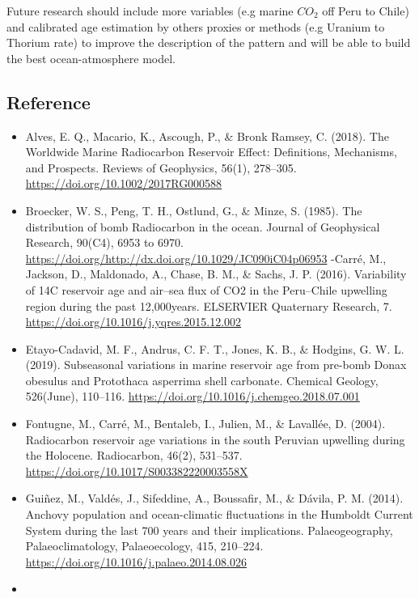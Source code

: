 \documentclass[
]{article}
\providecommand{\tightlist}{%
  \setlength{\itemsep}{0pt}\setlength{\parskip}{0pt}}
\begin{document}
Future research should include more variables (e.g marine \(CO_2\) off
Peru to Chile) and calibrated age estimation by others proxies or
methods (e.g Uranium to Thorium rate) to improve the description of the
pattern and will be able to build the best ocean-atmosphere model.

\hypertarget{reference}{%
\subsection{Reference}\label{reference}}

\begin{itemize}
\tightlist
\item
  Alves, E. Q., Macario, K., Ascough, P., \& Bronk Ramsey, C. (2018).
  The Worldwide Marine Radiocarbon Reservoir Effect: Definitions,
  Mechanisms, and Prospects. Reviews of Geophysics, 56(1), 278--305.
  \url{https://doi.org/10.1002/2017RG000588}
\item
  Broecker, W. S., Peng, T. H., Ostlund, G., \& Minze, S. (1985). The
  distribution of bomb Radiocarbon in the ocean. Journal of Geophysical
  Research, 90(C4), 6953 to 6970.
  \url{https://doi.org/http://dx.doi.org/10.1029/JC090iC04p06953}
  -Carré, M., Jackson, D., Maldonado, A., Chase, B. M., \& Sachs, J. P.
  (2016). Variability of 14C reservoir age and air--sea flux of CO2 in
  the Peru--Chile upwelling region during the past 12,000years.
  ELSERVIER Quaternary Research, 7.
  \url{https://doi.org/10.1016/j.yqres.2015.12.002}
\item
  Etayo-Cadavid, M. F., Andrus, C. F. T., Jones, K. B., \& Hodgins, G.
  W. L. (2019). Subseasonal variations in marine reservoir age from
  pre-bomb Donax obesulus and Protothaca asperrima shell carbonate.
  Chemical Geology, 526(June), 110--116.
  \url{https://doi.org/10.1016/j.chemgeo.2018.07.001}
\item
  Fontugne, M., Carré, M., Bentaleb, I., Julien, M., \& Lavallée, D.
  (2004). Radiocarbon reservoir age variations in the south Peruvian
  upwelling during the Holocene. Radiocarbon, 46(2), 531--537.
  \url{https://doi.org/10.1017/S003382220003558X}
\item
  Guiñez, M., Valdés, J., Sifeddine, A., Boussafir, M., \& Dávila, P. M.
  (2014). Anchovy population and ocean-climatic fluctuations in the
  Humboldt Current System during the last 700 years and their
  implications. Palaeogeography, Palaeoclimatology, Palaeoecology, 415,
  210--224. \url{https://doi.org/10.1016/j.palaeo.2014.08.026}
\item

\end{itemize}
\end{document}
